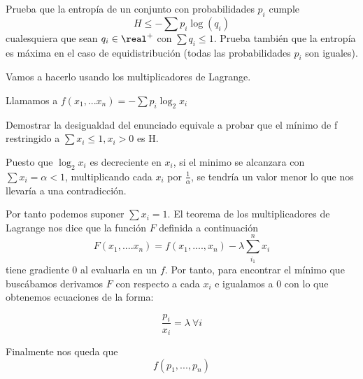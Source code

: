 \begin{problem}[3]
	Prueba que la entropía de un conjunto con probabilidades $p_i$ cumple
	\[H \leq -\sum p_i \log(q_i)\]
	cualesquiera que sean $q_i\in \real^+$ con $\sum q_i \leq 1$. Prueba también que la entropía es máxima en el caso de equidistribución (todas las probabilidades $p_i$ son iguales).
	\solution

	Vamos a hacerlo usando los multiplicadores de Lagrange.

	Llamamos a $f(x_1, ... x_n) = - \sum p_i \log_2 x_i$

	Demostrar la desigualdad del enunciado equivale a probar que el mínimo de f restringido a $\sum x_i \leq 1, x_i > 0$ es H.

	Puesto que $\log_2 x_i$ es decreciente en $x_i$, si el minimo se alcanzara con $\sum x_i = \alpha < 1$, multiplicando cada $x_i$ por $\frac{1}{\alpha}$, se tendría un valor menor lo que nos llevaría a una contradicción.

	Por tanto podemos suponer $\sum x_i = 1$. El teorema de los multiplicadores de Lagrange nos dice que la función $F$ definida a continuación
	$$F(x_1, .... x_n) = f(x_1, ...., x_n) - \lambda \sum_{i_1}^{n} x_i$$
	tiene gradiente 0 al evaluarla en un $f$. Por tanto, para encontrar el mínimo que buscábamos derivamos $F$ con respecto a cada $x_i$ e igualamos a 0 con lo que obtenemos ecuaciones de la forma:

	\[\frac{p_i}{x_i}=λ \ \forall i\]


	Finalmente nos queda que
	$$f(p_1, ...,p_n)$$
\end{problem}


